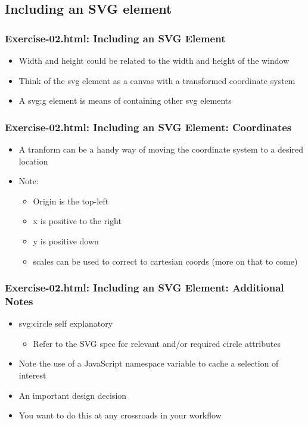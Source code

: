 \documentclass{beamer}
\begin{document}
\subsection{Including an SVG element}


\begin{frame}
    \frametitle{Exercise-02.html: Including an SVG Element}
    \begin{itemize}
    \item Width and height could be related to the width and height of the window
    \item Think of the svg element as a canvas with a transformed coordinate system
    \item A svg:g element is means of containing other svg elements
    \end{itemize}
\end{frame}



\begin{frame}
    \frametitle{Exercise-02.html: Including an SVG Element: Coordinates}
    \begin{itemize}
    \item A tranform can be a handy way of moving the coordinate system to a desired location
    \item Note:
        \begin{itemize}
        \item Origin is the top-left
        \item x is positive to the right
        \item y is positive down
        \item scales can be used to correct to cartesian coords (more on that to come)
        \end{itemize}
    \end{itemize}
\end{frame}



\begin{frame}
    \frametitle{Exercise-02.html: Including an SVG Element: Additional Notes}
    \begin{itemize}
    \item svg:circle self explanatory
        \begin{itemize}
        \item Refer to the SVG spec for relevant and/or required circle attributes
        \end{itemize}
    \item Note the use of a JavaScript namespace variable to cache a selection of interest
    \item An important design decision
    \item You want to do this at any crossroads in your workflow
    \end{itemize}
\end{frame}
\end{document}
